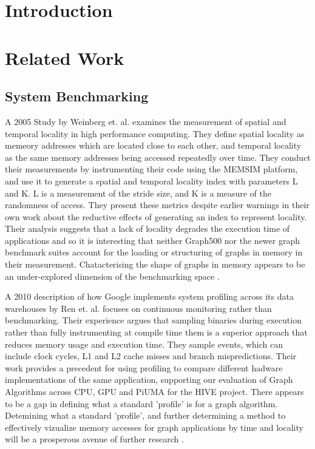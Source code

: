 \documentclass[sigconf,authordraft]{acmart}
\begin{document}
\section{Introduction}


\section{Related Work}

\subsection{System Benchmarking}

\par{A 2005 Study by Weinberg et. al. examines the measurement of spatial and temporal locality in high performance computing. 
They define spatial locality as memeory addresses which are located close to each other, and temporal locality as the same memory addresses being accessed repeatedly over time. 
They conduct their measurements by instrumenting their code using the MEMSIM platform, and use it to generate a spatial and temporal locality index with parameters L and K. 
L is a measurement of the stride size, and K is a measure of the randomness of access. 
They present these metrics despite earlier warnings in their own work about the reductive effects of generating an index to represent locality. 
Their analysis suggests that a lack of locality degrades the execution time of applications and so it is interesting that neither Graph500 nor the newer graph benchmark suites account for the loading or structuring of graphs in memory in their measurement. 
Chatacterising the shape of graphs in memory appears to be an under-explored dimension of the benchmarking space \cite{Weinberg2005}.}

\par{A 2010 description of how Google implements system profiling across its data warehouses by Ren et. al. focuses on continuous monitoring rather than benchmarking.  
Their experience argues that sampling binaries during execution rather than fully instrumenting at compile time them is a superior approach that reduces memory usage and execution time. 
They sample events, which can include clock cycles, L1 and L2 cache misses and branch mispredictions. 
Their work provides a precedent for using profiling to compare different hadware implementations of the same application, supporting our evaluation of Graph Algorithms across CPU, GPU and PiUMA for the HIVE project. 
There appears to be a gap in defining what a standard 'profile' is for a graph algorithm. 
Detemining what a standard 'profile', and further determining a method to effectively vizualize memory accesses for graph applications by time and locality will be a prosperous avenue of further research \cite{Ren2010}.}
\end{document}
